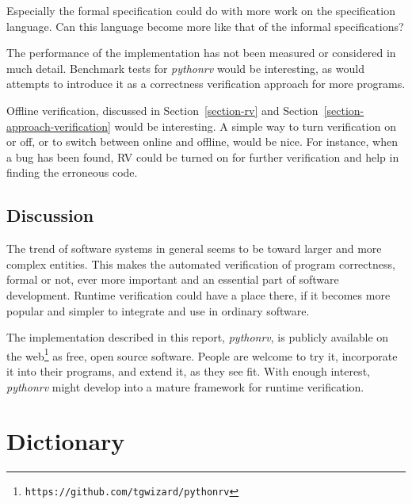 \documentclass[a4paper,11pt]{kth-mag}
\begin{document}
Especially the formal specification could do with more work on the
specification language. Can this language become more like that of the informal
specifications?

The performance of the implementation has not been measured or considered in
much detail. Benchmark tests for \textit{pythonrv} would be interesting, as
would attempts to introduce it as a correctness verification approach for more
programs.

Offline verification, discussed in Section~\ref{section-rv} and
Section~\ref{section-approach-verification} would be interesting. A simple way
to turn verification on or off, or to switch between online and offline, would
be nice. For instance, when a bug has been found, RV could be turned on for
further verification and help in finding the erroneous code.

\section{Discussion}

The trend of software systems in general seems to be toward larger and more
complex entities. This makes the automated verification of program
correctness, formal or not, ever more important and an essential part of
software development. Runtime verification could have a place there, if it
becomes more popular and simpler to integrate and use in ordinary software.

The implementation described in this report, \textit{pythonrv}, is publicly
available on the web\footnote{\texttt{https://github.com/tgwizard/pythonrv}} as
free, open source software. People are welcome to try it, incorporate it into
their programs, and extend it, as they see fit. With enough interest,
\textit{pythonrv} might develop into a mature framework for runtime
verification.












\appendix
\addappheadtotoc

\chapter{Dictionary} \label{appendix-dictionary}
\end{document}

